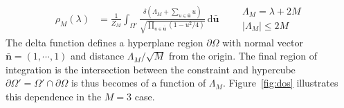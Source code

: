 \documentclass{article}[12pt]
\numberwithin{equation}{section}
\begin{document}
\begin{align*}
  \rho_M(\lambda)&=\frac{1}{Z_M}
  \int_{\Omega'}\!
  \frac{\delta(\Lambda_M+\sum_{u\in\bar{\mathbf{u}}}u)}
  {\sqrt{\prod_{u\in\bar{\mathbf{u}}}(1-u^2/4) }}
  \,\mathrm{d}\bar{\mathbf{u}}
  \qquad
  \begin{matrix}
    \Lambda_M=\lambda+2M \\
    |\Lambda_M|\leq2M
  \end{matrix}
\end{align*}
The delta function defines a hyperplane region $\partial\Omega$ with
normal vector $\bar{\mathbf{n}}=(1,\cdots,1)$ and distance
$\Lambda_M/\sqrt{M}$ from the origin. The final region of
integration is the intersection between the constraint and hypercube
$\partial\Omega'=\Omega'\cap\partial\Omega$
is thus becomes of a function of $\Lambda_M$. Figure~\ref{fig:dos}
illustrates this dependence in the $M=3$ case.
\end{document}

